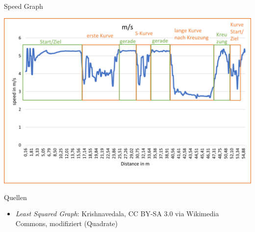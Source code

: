 \documentclass[aspectratio=169]{beamer}
\begin{document}
\begin{frame}{Speed Graph}
	\begin{center}
		\includegraphics[height=.9\textheight]{img/SpeedPlot.png}
	\end{center}
\end{frame}

\begin{frame}[fragile]{Quellen}

	\begin{itemize}
		\item \emph{Least Squared Graph}: Krishnavedala, CC BY-SA 3.0 via Wikimedia Commons, modifiziert (Quadrate)
	\end{itemize}

\end{frame}
\end{document}
